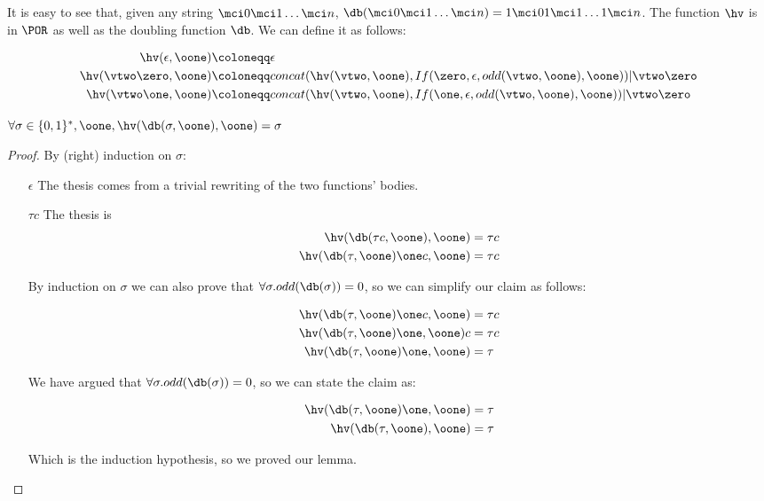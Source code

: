 It is easy to see that, given any string $\mci 0\mci 1\ldots \mci n$, $\db(\mci 0\mci 1\ldots \mci n)=1\mci 0 1\mci 1\ldots 1 \mci n$. The function $\hv$ is in $\POR$ as well as the doubling function $\db$. We can define it as follows:

\begin{align*}
\hv (\epsilon, \oone)&\coloneqq \epsilon\\
\hv (\vtwo \zero, \oone)&\coloneqq concat(\hv(\vtwo, \oone), If(\zero, \epsilon, odd(\vtwo, \oone), \oone))|\vtwo\zero \\
\hv (\vtwo \one, \oone)&\coloneqq concat(\hv(\vtwo, \oone), If(\one, \epsilon,  odd(\vtwo, \oone), \oone))|\vtwo\zero\\
\end{align*}

\begin{lemma}
$\forall \sigma \in \{0,1\}^*, \oone, \hv(\db(\sigma,\oone),\oone)=\sigma$
\end{lemma}

\begin{proof}
By (right) induction on $\sigma$:
\begin{itemize}
\item[$\epsilon$] The thesis comes from a trivial rewriting of the two functions' bodies.
\item[$\tau c$] The thesis is
\begin{align*}
\hv(\db(\tau c,\oone),\oone) &= \tau c\\
\hv(\db(\tau,\oone)\one c, \oone) &= \tau c\\
\end{align*}

By induction on $\sigma$ we can also prove that $\forall \sigma. odd(\db(\sigma))= 0$, so we can simplify our claim as follows:

\begin{align*}
\hv(\db(\tau,\oone)\one c, \oone) &= \tau c\\
\hv(\db(\tau,\oone)\one, \oone) c &= \tau c\\
\hv(\db(\tau,\oone)\one, \oone) &= \tau\\
\end{align*}

We have argued that $\forall \sigma. odd(\db(\sigma))= 0$, so we can state the claim as:

\begin{align*}
\hv(\db(\tau,\oone)\one, \oone) &= \tau\\
\hv(\db(\tau,\oone), \oone) &= \tau
\end{align*}

Which is the induction hypothesis, so we proved our lemma.
\end{itemize}
\end{proof}

